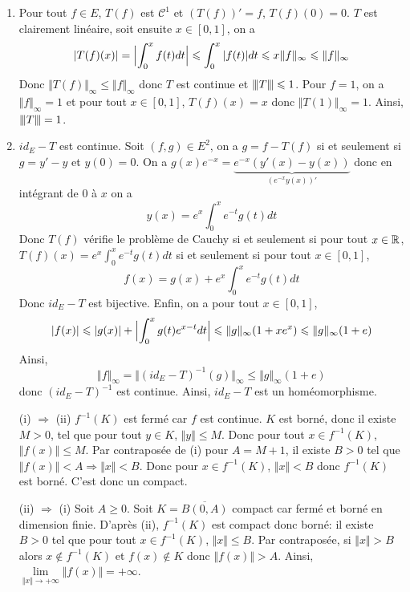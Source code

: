 \begin{solution}
	\phantom{}
	\begin{enumerate}
		\item Pour tout $f\in E$, $T(f)$ est $\mathcal{C}^{1}$ et $(T(f))'=f$, $T(f)(0)=0$. $T$ est clairement linéaire, soit ensuite $x\in[0,1]$, on a 
		$$\vert T(f)(x)\vert=\Bigl\lvert\int_{0}^{x}f(t)dt\Bigr\rvert\leqslant\int_{0}^{x}\vert f(t)\vert dt\leqslant x\Vert f\Vert_{\infty}\leqslant\Vert f\Vert_{\infty}$$
		Donc $\Vert T(f)\Vert_{\infty}\leqslant\Vert f\Vert_{\infty}$ donc $T$ est continue et ${\left\vert\kern-0.25ex\left\vert\kern-0.25ex\left\vert{}T \right\vert\kern-0.25ex\right\vert\kern-0.25ex\right\vert}\leqslant1$. Pour $f=1$, on a $\Vert f\Vert_{\infty}=1$ et pour tout $x\in[0,1]$, $T(f)(x)=x$ donc $\Vert T(1)\Vert_{\infty}=1$. Ainsi, ${\left\vert\kern-0.25ex\left\vert\kern-0.25ex\left\vert{}T \right\vert\kern-0.25ex\right\vert\kern-0.25ex\right\vert}=1$.

		\item $id_{E}-T$ est continue. Soit $(f,g)\in E^{2}$, on a $g=f-T(f)$ si et seulement si $g=y'-y$ et $y(0)=0$. 
		On a $g(x)e^{-x}=\underbrace{e^{-x}(y'(x)-y(x))}_{(e^{-x}y(x))'}$ donc en intégrant de 0 à $x$ on a 
		$$y(x)=e^{x}\int_{0}^{x}e^{-t}g(t)dt$$
		Donc $T(f)$ vérifie le problème de Cauchy si et seulement si pour tout $x\in\mathbb{R}$, $T(f)(x)=e^{x}\int_{0}^{x}e^{-t}g(t)dt$ si et seulement si pour tout $x\in[0,1]$, 
		$$f(x)=g(x)+e^{x}\int_{0}^{x}e^{-t}g(t)dt$$
		Donc $id_{E}-T$ est bijective. 
		Enfin, on a pour tout $x\in[0,1]$, 
		$$\vert f(x)\vert\leqslant\vert g(x)\vert+\Bigl\lvert\int_{0}^{x}g(t)e^{x-t}dt\Bigr\rvert\leqslant\Vert g\Vert_{\infty}(1+xe^{x})\leqslant\Vert g\Vert_{\infty}(1+e)$$
		Ainsi, 
		$$\Vert f\Vert_{\infty}=\Vert(id_{E}-T)^{-1}(g)\Vert_{\infty}\leqslant\Vert g\Vert_{\infty}(1+e)$$
		donc $(id_{E}-T)^{-1}$ est continue. Ainsi, $id_{E}-T$ est un homéomorphisme.
	\end{enumerate}
\end{solution}

\begin{solution}
	\phantom{}
	\begin{enumerate}
		\item [(i) $\Rightarrow$ (ii)] $f^{-1}(K)$ est fermé car $f$ est continue. $K$ est borné, donc il existe $M>0$, tel que pour tout $y\in K$, $\Vert y\Vert\leqslant M$. Donc pour tout $x\in f^{-1}(K)$, $\Vert f(x)\Vert\leqslant M$. Par contraposée de (i) pour $A=M+1$, il existe $B>0$ tel que $\Vert f(x)\Vert<A\Rightarrow\Vert x\Vert<B$. Donc pour $x\in f^{-1}(K)$, $\Vert x\Vert<B$ donc $f^{-1}(K)$ est borné. C'est donc un compact.
		\item [(ii) $\Rightarrow$ (i)] Soit $A\geqslant0$. Soit $K=\overline{B(0,A)}$ compact car fermé et borné en dimension finie. D'après (ii), $f^{-1}(K)$ est compact donc borné: il existe $B>0$ tel que pour tout $x\in f^{-1}(K)$, $\Vert x\Vert\leqslant B$. Par contraposée, si $\Vert x\Vert>B$ alors $x\notin f^{-1}(K)$ et $f(x)\notin K$ donc $\Vert f(x)\Vert >A$. Ainsi, $\lim\limits_{\Vert x\Vert\to+\infty}\Vert f(x)\Vert=+\infty$.
	\end{enumerate}
\end{solution}

